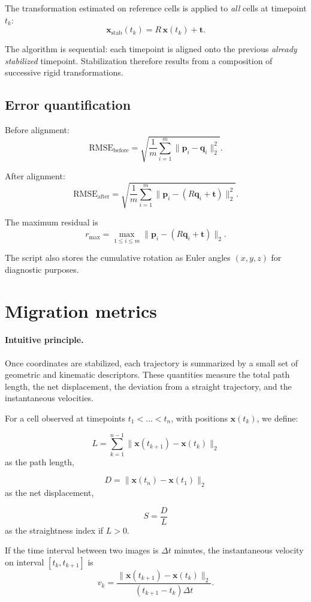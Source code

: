 \documentclass[11pt,a4paper]{article}
\begin{document}
The transformation estimated on reference cells is applied to \emph{all} cells at timepoint $t_k$:
\[
\mathbf{x}_{\mathrm{stab}}(t_k)=R\,\mathbf{x}(t_k)+\mathbf{t}.
\]

The algorithm is sequential: each timepoint is aligned onto the previous \emph{already stabilized} timepoint. Stabilization therefore results from a composition of successive rigid transformations.

\subsection{Error quantification}

Before alignment:
\[
\mathrm{RMSE}_{\mathrm{before}}
=
\sqrt{
\frac{1}{m}
\sum_{i=1}^{m}
\|\mathbf{p}_i-\mathbf{q}_i\|_2^2
}.
\]

After alignment:
\[
\mathrm{RMSE}_{\mathrm{after}}
=
\sqrt{
\frac{1}{m}
\sum_{i=1}^{m}
\|\mathbf{p}_i-(R\mathbf{q}_i+\mathbf{t})\|_2^2
}.
\]

The maximum residual is
\[
r_{\max}=
\max_{1\le i\le m}
\|\mathbf{p}_i-(R\mathbf{q}_i+\mathbf{t})\|_2.
\]

The script also stores the cumulative rotation as Euler angles $(x,y,z)$ for diagnostic purposes.

\section{Migration metrics}

\paragraph{Intuitive principle.}
Once coordinates are stabilized, each trajectory is summarized by a small set of geometric and kinematic descriptors. These quantities measure the total path length, the net displacement, the deviation from a straight trajectory, and the instantaneous velocities.

For a cell observed at timepoints $t_1<\dots<t_n$, with positions $\mathbf{x}(t_k)$, we define:

\[
L=\sum_{k=1}^{n-1}\|\mathbf{x}(t_{k+1})-\mathbf{x}(t_k)\|_2
\]
as the path length,

\[
D=\|\mathbf{x}(t_n)-\mathbf{x}(t_1)\|_2
\]
as the net displacement,

\[
S=\frac{D}{L}
\]
as the straightness index if $L>0$.

If the time interval between two images is $\Delta t$ minutes, the instantaneous velocity on interval $[t_k,t_{k+1}]$ is
\[
v_k=
\frac{\|\mathbf{x}(t_{k+1})-\mathbf{x}(t_k)\|_2}
{(t_{k+1}-t_k)\Delta t}.
\]
\end{document}
